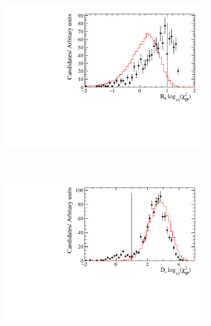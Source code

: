 \begin{figure}[!h]
\begin{subfigure}[t]{0.32\textwidth}
      \includegraphics[width=1.0\textwidth]{figs/Selection/Data_MC_Comparison_Var_1_B2DsPhi_Ds2KPiPi.pdf}
      \caption{\decay{\Dsp}{\Kp\pim\pip}}
   \end{subfigure}\\
   \begin{subfigure}[t]{0.32\textwidth}
      \centering
      \includegraphics[width=1.0\textwidth]{figs/Selection/Data_MC_Comparison_Var_2_B2DsPhi_Ds2KKPi.pdf}
      \caption{\decay{\Dsp}{\Kp\Km\pip}}
   \end{subfigure}
   \begin{subfigure}[t]{0.32\textwidth}
      \centering

\end{subfigure}
\end{figure}
